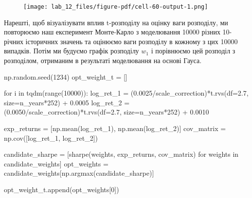 \documentclass[
  letterpaper,
]{report}
\newenvironment{Shaded}{\begin{snugshade}}{\end{snugshade}}
\newcommand{\BuiltInTok}[1]{\textcolor[rgb]{0.00,0.23,0.31}{#1}}
\newcommand{\ControlFlowTok}[1]{\textcolor[rgb]{0.00,0.23,0.31}{#1}}
\newcommand{\DecValTok}[1]{\textcolor[rgb]{0.68,0.00,0.00}{#1}}
\newcommand{\FloatTok}[1]{\textcolor[rgb]{0.68,0.00,0.00}{#1}}
\newcommand{\KeywordTok}[1]{\textcolor[rgb]{0.00,0.23,0.31}{#1}}
\newcommand{\NormalTok}[1]{\textcolor[rgb]{0.00,0.23,0.31}{#1}}
\newcommand{\OperatorTok}[1]{\textcolor[rgb]{0.37,0.37,0.37}{#1}}
\begin{document}
\begin{figure}[H]

{\centering \texttt{[image: lab\_12\_files/figure-pdf/cell-60-output-1.png]}

}

\end{figure}

Нарешті, щоб візуалізувати вплив t-розподілу на оцінку ваги розподілу,
ми повторюємо наш експеримент Монте-Карло з моделювання 10000 різних
10-річних історичних значень та оцінюємо ваги розподілу в кожному з цих
10000 випадків. Потім ми будуємо графік розподілу \(w_1\) і порівнюємо
цей розподіл з розподілом, отриманим в результаті моделювання на основі
Гауса.

\begin{Shaded}
\begin{Highlighting}[]
\NormalTok{np.random.seed(}\DecValTok{1234}\NormalTok{)}
\NormalTok{opt\_weight\_t }\OperatorTok{=}\NormalTok{ []}

\ControlFlowTok{for}\NormalTok{ i }\KeywordTok{in}\NormalTok{ tqdm(}\BuiltInTok{range}\NormalTok{(}\DecValTok{10000}\NormalTok{)):}
\NormalTok{    log\_ret\_1 }\OperatorTok{=}\NormalTok{ (}\FloatTok{0.0025}\OperatorTok{/}\NormalTok{scale\_correction)}\OperatorTok{*}\NormalTok{t.rvs(df}\OperatorTok{=}\FloatTok{2.7}\NormalTok{, size}\OperatorTok{=}\NormalTok{n\_years}\OperatorTok{*}\DecValTok{252}\NormalTok{) }\OperatorTok{+} \FloatTok{0.0005}
\NormalTok{    log\_ret\_2 }\OperatorTok{=}\NormalTok{ (}\FloatTok{0.0050}\OperatorTok{/}\NormalTok{scale\_correction)}\OperatorTok{*}\NormalTok{t.rvs(df}\OperatorTok{=}\FloatTok{2.7}\NormalTok{, size}\OperatorTok{=}\NormalTok{n\_years}\OperatorTok{*}\DecValTok{252}\NormalTok{) }\OperatorTok{+} \FloatTok{0.0010}

\NormalTok{    exp\_returns }\OperatorTok{=}\NormalTok{ [np.mean(log\_ret\_1), np.mean(log\_ret\_2)]}
\NormalTok{    cov\_matrix }\OperatorTok{=}\NormalTok{ np.cov([log\_ret\_1, log\_ret\_2])}

\NormalTok{    candidate\_sharpe }\OperatorTok{=}\NormalTok{ [sharpe(weights, exp\_returns, cov\_matrix) }\ControlFlowTok{for}\NormalTok{ weights }\KeywordTok{in}\NormalTok{ candidate\_weights]}
\NormalTok{    opt\_weights }\OperatorTok{=}\NormalTok{ candidate\_weights[np.argmax(candidate\_sharpe)]}

\NormalTok{    opt\_weight\_t.append(opt\_weights[}\DecValTok{0}\NormalTok{])}
\end{Highlighting}
\end{Shaded}
\end{document}
